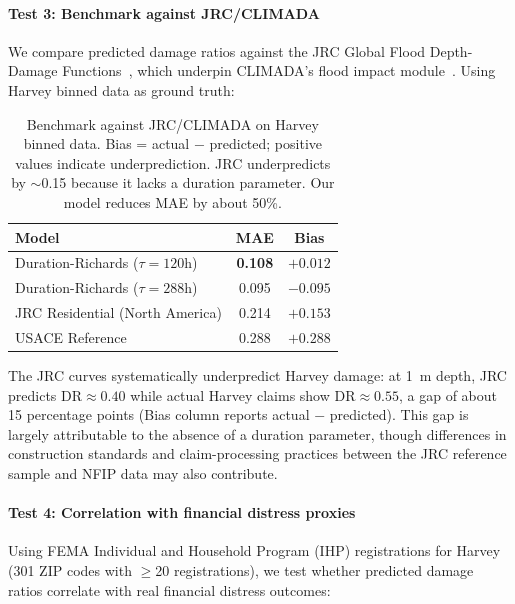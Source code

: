 \paragraph{Test 3: Benchmark against JRC/CLIMADA}
We compare predicted damage ratios against the JRC Global Flood Depth-Damage Functions~\cite{huizinga2017global}, which underpin CLIMADA's flood impact module~\cite{aznar2019climada}. Using Harvey binned data as ground truth:

\begin{table}[h!]
\centering
\begin{tabular}{|l|c|c|}
\hline
\textbf{Model} & \textbf{MAE} & \textbf{Bias} \\
\hline
Duration-Richards ($\tau = 120$h) & \textbf{0.108} & $+0.012$ \\
Duration-Richards ($\tau = 288$h) & 0.095 & $-0.095$ \\
JRC Residential (North America) & 0.214 & $+0.153$ \\
USACE Reference & 0.288 & $+0.288$ \\
\hline
\end{tabular}
\caption{Benchmark against JRC/CLIMADA on Harvey binned data. Bias = actual $-$ predicted; positive values indicate underprediction. JRC underpredicts by $\sim$0.15 because it lacks a duration parameter. Our model reduces MAE by about 50\%.}
\label{tab: climada benchmark}
\end{table}

The JRC curves systematically underpredict Harvey damage: at 1~m depth, JRC predicts $\text{DR} \approx 0.40$ while actual Harvey claims show $\text{DR} \approx 0.55$, a gap of about 15 percentage points (Bias column reports actual $-$ predicted). This gap is largely attributable to the absence of a duration parameter, though differences in construction standards and claim-processing practices between the JRC reference sample and NFIP data may also contribute.

\paragraph{Test 4: Correlation with financial distress proxies}
Using FEMA Individual and Household Program (IHP) registrations for Harvey (301 ZIP codes with $\geq$20 registrations), we test whether predicted damage ratios correlate with real financial distress outcomes:

